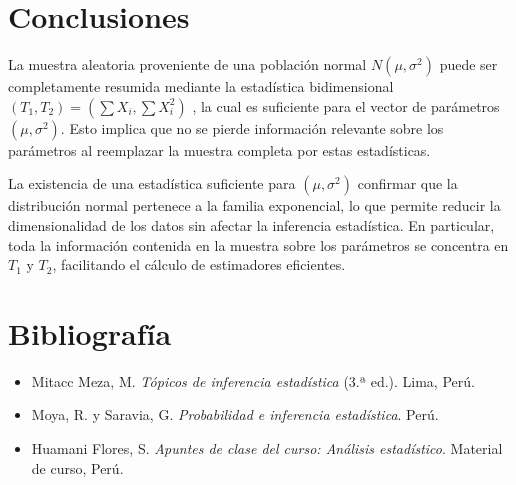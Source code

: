 \documentclass[
  11pt,
]{report}
\providecommand{\tightlist}{%
  \setlength{\itemsep}{0pt}\setlength{\parskip}{0pt}}
\begin{document}
\section{Conclusiones}\label{conclusiones}

La muestra aleatoria proveniente de una población normal
\(N(\mu,\sigma^2)\) puede ser completamente resumida mediante la
estadística bidimensional \((T_1,T_2)=\left(\sum X_i,\sum X_i^2\right)\)
, la cual es suficiente para el vector de parámetros \((\mu,\sigma^2)\).
Esto implica que no se pierde información relevante sobre los parámetros
al reemplazar la muestra completa por estas estadísticas.

La existencia de una estadística suficiente para \((\mu,\sigma^2)\)
confirmar que la distribución normal pertenece a la familia exponencial,
lo que permite reducir la dimensionalidad de los datos sin afectar la
inferencia estadística. En particular, toda la información contenida en
la muestra sobre los parámetros se concentra en \(T_1 \text{ y } T_2\),
facilitando el cálculo de estimadores eficientes.

\section{Bibliografía}\label{bibliografuxeda}

\begin{itemize}
\tightlist
\item
  Mitacc Meza, M. \emph{Tópicos de inferencia estadística} (3.ª ed.).
  Lima, Perú.
\end{itemize}

\begin{itemize}
\tightlist
\item
  Moya, R. y Saravia, G. \emph{Probabilidad e inferencia estadística}.
  Perú.
\end{itemize}

\begin{itemize}
\tightlist
\item
  Huamani Flores, S. \emph{Apuntes de clase del curso: Análisis
  estadístico}. Material de curso, Perú.
\end{itemize}
\end{document}
